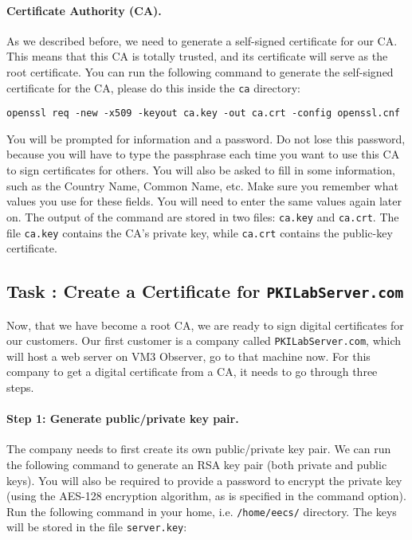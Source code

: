 \documentclass{article}
\begin{document}
\paragraph{Certificate Authority (CA).} 
As we described before, we need to generate a self-signed certificate for our
CA. This means that this CA is totally trusted, and its certificate will serve
as the root certificate.  You can run the following command to generate  
the self-signed certificate for the CA, please do this inside the {\tt ca} directory:
\begin{verbatim}
openssl req -new -x509 -keyout ca.key -out ca.crt -config openssl.cnf
\end{verbatim}

You will be prompted for information and a password. Do not lose this password,
because you will have to type the passphrase 
each time you want to use this CA to sign certificates for others.
You will also be asked to fill in some information,
such as the Country Name, Common Name, etc. Make sure you remember what values you use for these fields. You will need to enter the same values again later on.
The output of the command are stored in two files: {\tt ca.key} and 
{\tt ca.crt}. The file {\tt ca.key} contains the 
CA's private key, while {\tt ca.crt} contains the public-key certificate.


\subsection{Task \mytask: Create a Certificate for {\tt PKILabServer.com}}

Now, that we have become a root CA, we are ready to sign digital certificates for 
our customers. Our first customer is a company called {\tt PKILabServer.com}, which will host a web server on VM3 Observer, go to that machine now. 
For this company to get a digital certificate from a CA, it needs to
go through three steps.


\paragraph{Step 1: Generate public/private key pair.}
The company needs to first create its own public/private key pair. We can run  
the following command to generate an RSA key pair (both private and public keys).  
You will also be required to provide a password to encrypt the private 
key (using the AES-128 encryption algorithm, as is specified in the command option). Run the following command in your home, i.e. {\tt /home/eecs/} directory. 
The keys will be stored in the file {\tt server.key}:
\end{document}
